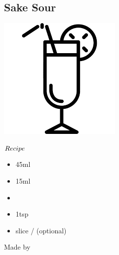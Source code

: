 \subsection{Sake Sour}
\vspace{-7.6mm}
\hspace{30mm}
\includegraphics[scale=.07]{cocktail_glass_tall.png}
\vspace{2.5mm}
\begin{itembox}[l]{\boldmath $Recipe$}
\begin{itemize}
\setlength{\parskip}{0cm}
\setlength{\itemsep}{0cm}
\item \sake 45ml
\item \lj 15ml
\item \soda
\item \gumsyrup 1tsp
\item \lemon slice / \cherry (optional)
\end{itemize}
\vspace{-4mm}
Made by \build
\end{itembox}
